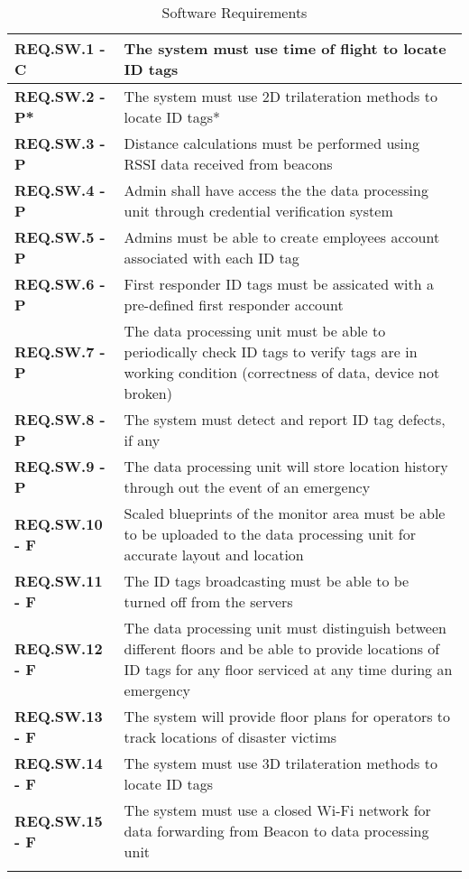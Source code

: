 \bigskip

\bgroup
\def\arraystretch{1.5}
\begin{longtable}[H]{ | m{3.5cm} | m{12.5cm} |}
 \hline
 \textbf{REQ.SW.1 - C} & The system must use time of flight to locate ID tags \\
\hline
 \textbf{REQ.SW.2 - P*} & The system must use 2D trilateration methods to locate ID tags* \\
\hline
 \textbf{REQ.SW.3 - P} & Distance calculations must be performed using RSSI data received from beacons \\
\hline
 \textbf{REQ.SW.4 - P} & Admin shall have access the the data processing unit through credential verification system \\
\hline
 \textbf{REQ.SW.5 - P} & Admins must be able to create employees account associated with each ID tag \\
\hline
 \textbf{REQ.SW.6 - P} & First responder ID tags must be assicated with a pre-defined first responder account \\
\hline
 \textbf{REQ.SW.7 - P} & The data processing unit must be able to periodically check ID tags to verify tags are in working condition (correctness of data, device not broken) \\
\hline
 \textbf{REQ.SW.8 - P} & The system must detect and report ID tag defects, if any \\
\hline
 \textbf{REQ.SW.9 - P} & The data processing unit will store location history through out the event of an emergency \\
\hline
 \textbf{REQ.SW.10 - F} & Scaled blueprints of the monitor area must be able to be uploaded to the data processing unit for accurate layout and location \\
\hline
 \textbf{REQ.SW.11 - F} & The ID tags broadcasting must be able to be turned off from the servers \\
\hline
 \textbf{REQ.SW.12 - F} & The data processing unit must distinguish between different floors and be able to provide locations of ID tags for any floor serviced at any time during an emergency \\
\hline
 \textbf{REQ.SW.13 - F} & The system will provide floor plans for operators to track locations of disaster victims \\
\hline
 \textbf{REQ.SW.14 - F} & The system must use 3D trilateration methods to locate ID tags \\
\hline
 \textbf{REQ.SW.15 - F} & The system must use a closed Wi-Fi network for data forwarding from Beacon to data processing unit \\
\hline
\caption{Software Requirements}
\end{longtable}

